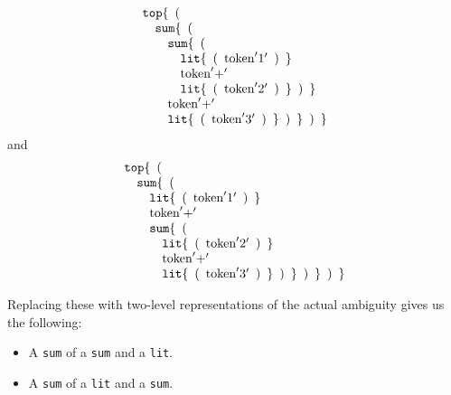 \documentclass{kththesis}
\begin{document}
$$
\begin{array}{l}
\text{\texttt{top}}\{ \enspace \text{(} \\
\quad \text{\texttt{sum}} \{ \enspace \text{(} \\
\qquad \text{\texttt{sum}} \{ \enspace \text{(} \\
\qquad \quad \text{\texttt{lit}} \{ \enspace \text{(} \enspace \text{token}'1' \enspace \text{)} \enspace \} \\
\qquad \quad \text{token}'+' \\
\qquad \quad \text{\texttt{lit}} \{ \enspace \text{(} \enspace \text{token}'2' \enspace \text{)} \enspace \} \enspace \text{)} \enspace \} \\
\qquad \text{token}'+' \\
\qquad \text{\texttt{lit}}\{ \enspace \text{(} \enspace \text{token}'3' \enspace \text{)} \enspace \} \enspace \text{)} \enspace \} \enspace \text{)} \enspace \} \\
\end{array}
$$
and
$$
\begin{array}{l}
\text{\texttt{top}}\{ \enspace \text{(} \\
\quad \text{\texttt{sum}} \{ \enspace \text{(} \\
\qquad \text{\texttt{lit}}\{ \enspace \text{(} \enspace \text{token}'1' \enspace \text{)} \enspace \} \\
\qquad \text{token}'+' \\
\qquad \text{\texttt{sum}} \{ \enspace \text{(} \\
\qquad \quad \text{\texttt{lit}} \{ \enspace \text{(} \enspace \text{token}'2' \enspace \text{)} \enspace \} \\
\qquad \quad \text{token}'+' \\
\qquad \quad \text{\texttt{lit}} \{ \enspace \text{(} \enspace \text{token}'3' \enspace \text{)} \enspace \} \enspace \text{)} \enspace \} \enspace \text{)} \enspace \} \enspace \text{)} \enspace \} \\
\end{array}
$$

Replacing these with two-level representations of the actual ambiguity gives us the following:

\begin{itemize}
  \item A \texttt{sum} of a \texttt{sum} and a \texttt{lit}.
  \item A \texttt{sum} of a \texttt{lit} and a \texttt{sum}.
\end{itemize}
\end{document}
